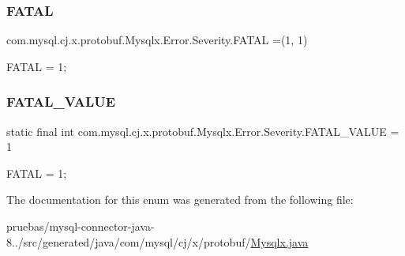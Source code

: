 \subsubsection{\texorpdfstring{F\+A\+T\+AL}{FATAL}}
{\footnotesize\ttfamily com.\+mysql.\+cj.\+x.\+protobuf.\+Mysqlx.\+Error.\+Severity.\+F\+A\+T\+AL =(1, 1)}

{\ttfamily F\+A\+T\+AL = 1;} \mbox{\label{enumcom_1_1mysql_1_1cj_1_1x_1_1protobuf_1_1_mysqlx_1_1_error_1_1_severity_a9a7fd9a779b2f269f688463f2bd46392}} 
\subsubsection{\texorpdfstring{F\+A\+T\+A\+L\+\_\+\+V\+A\+L\+UE}{FATAL\_VALUE}}
{\footnotesize\ttfamily  static  final int com.\+mysql.\+cj.\+x.\+protobuf.\+Mysqlx.\+Error.\+Severity.\+F\+A\+T\+A\+L\+\_\+\+V\+A\+L\+UE = 1\hspace{0.3cm}{\ttfamily [static]}}

{\ttfamily F\+A\+T\+AL = 1;} 

The documentation for this enum was generated from the following file\+:\begin{DoxyCompactItemize}
\item 
pruebas/mysql-\/connector-\/java-\/8../src/generated/java/com/mysql/cj/x/protobuf/\mbox{\hyperlink{_mysqlx_8java}{Mysqlx.\+java}}\end{DoxyCompactItemize}
